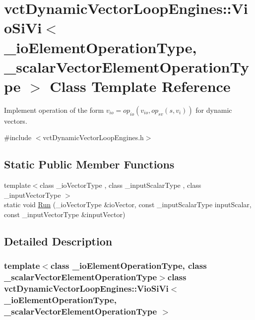 \hypertarget{classvct_dynamic_vector_loop_engines_1_1_vio_si_vi}{\section{vct\-Dynamic\-Vector\-Loop\-Engines\-:\-:Vio\-Si\-Vi$<$ \-\_\-io\-Element\-Operation\-Type, \-\_\-scalar\-Vector\-Element\-Operation\-Type $>$ Class Template Reference}
\label{classvct_dynamic_vector_loop_engines_1_1_vio_si_vi}
}


Implement operation of the form $v_{io} = op_{io}(v_{io}, op_{sv}(s, v_i))$ for dynamic vectors.  




{\ttfamily \#include $<$vct\-Dynamic\-Vector\-Loop\-Engines.\-h$>$}

\subsection*{Static Public Member Functions}
\begin{DoxyCompactItemize}
\item 
{\footnotesize template$<$class \-\_\-io\-Vector\-Type , class \-\_\-input\-Scalar\-Type , class \-\_\-input\-Vector\-Type $>$ }\\static void \hyperlink{classvct_dynamic_vector_loop_engines_1_1_vio_si_vi_aa33d203e2e29f5b88729ccefd2e57af4}{Run} (\-\_\-io\-Vector\-Type \&io\-Vector, const \-\_\-input\-Scalar\-Type input\-Scalar, const \-\_\-input\-Vector\-Type \&input\-Vector)
\end{DoxyCompactItemize}


\subsection{Detailed Description}
\subsubsection*{template$<$class \-\_\-io\-Element\-Operation\-Type, class \-\_\-scalar\-Vector\-Element\-Operation\-Type$>$class vct\-Dynamic\-Vector\-Loop\-Engines\-::\-Vio\-Si\-Vi$<$ \-\_\-io\-Element\-Operation\-Type, \-\_\-scalar\-Vector\-Element\-Operation\-Type $>$}

